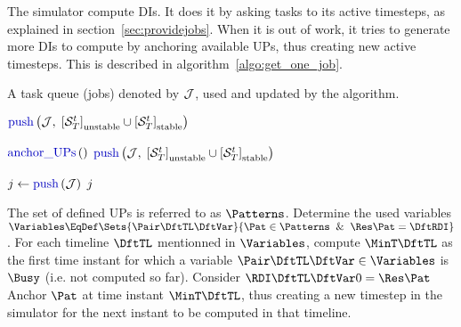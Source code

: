 The simulator compute DIs. It does it by asking tasks to its active timesteps, as explained in section~\ref{sec:providejobs}. When it is out of work, it tries to generate more DIs to compute by anchoring available UPs, thus creating new active timesteps. This is described in algorithm~\ref{algo:get_one_job}.
\begin{algorithm}
  \caption{$\cxSimA$ \label{algo:get_one_job}}
  \begin{algorithmic}[1]
    \REQUIRE A task queue (jobs) denoted by ${\cal J}$, used and updated by the algorithm.
    \IF{$\cxSimB$}
    \STATE {}
    
    \IF{$\cxSimC$}
    \STATE $\cxSimD$ 
    \ENDIF
    \ENDFOR
    
    \IF{$\cxSimB$}
    \STATE {}
    \STATE {}
    \STATE $\cxSimE$ 
    \STATE {}
    \IF{$\cxSimC$}
    \STATE $\cxSimD$ 
    \ENDIF
    \ENDFOR
    \ENDIF

    
    \ENDIF
    \IF{$\cxSimB$}
    \RETURN {}
    \ELSE
    \STATE $\cxSimF$
    \RETURN $j$ 
    \ENDIF
  \end{algorithmic}
\end{algorithm}


\begin{algorithm}
  \caption{$\CallCode{anchor\_UPs}{}$ \label{algo:anchor}}
  \begin{algorithmic}[1]
    \REQUIRE The set of defined UPs is referred to as $\Patterns$.
    \STATE Determine the used variables $\Variables \EqDef \Sets{\Pair\DftTL\DftVar}{\Pat\in\Patterns\And\Res\Pat=\DftRDI}$.
    \STATE For each timeline $\DftTL$ mentionned in $\Variables$, compute $\MinT\DftTL$ as the first time instant for which a variable $\Pair\DftTL\DftVar \in \Variables$ is $\Busy$ (i.e. not computed so far).
    \FORALL{$\Pat \in \Patterns$}
    \STATE Consider $\RDI\DftTL\DftVar 0 = \Res\Pat$
    \IF{$\Status{\DI\DftTL\DftVar{\MinT\DftTL} = \Busy}$}
    \STATE Anchor $\Pat$ at time instant $\MinT\DftTL$, thus creating a new timestep in the simulator for the next instant to be computed in that timeline.
    \ELSE
    \STATE {}
    \ENDIF
    \ENDFOR
  \end{algorithmic}
\end{algorithm}



